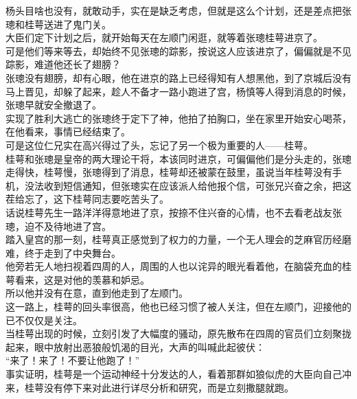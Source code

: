 \begin{multicols}{\theparacolNo}
杨头目啥也没有，就敢动手，实在是缺乏考虑，但就是这么个计划，还是差点把张璁和桂萼送进了鬼门关。\\

大臣们定下计划之后，就开始每天在左顺门闲逛，就等着张璁桂萼进京了。\\

可是他们等来等去，却始终不见张璁的踪影，按说这人应该进京了，偏偏就是不见踪影，难道他还长了翅膀？\\

张璁没有翅膀，却有心眼，他在进京的路上已经得知有人想黑他，到了京城后没有马上晋见，却躲了起来，趁人不备才一路小跑进了宫，杨慎等人得到消息的时候，张璁早就安全撤退了。\\

实现了胜利大逃亡的张璁终于定下了神，他拍了拍胸口，坐在家里开始安心喝茶，在他看来，事情已经结束了。\\

可是这位仁兄实在高兴得过了头，忘记了另一个极为重要的人——桂萼。\\

桂萼和张璁是皇帝的两大理论干将，本该同时进京，可偏偏他们是分头走的，张璁走得快，桂萼慢，张璁得到了消息，桂萼却还被蒙在鼓里，虽说当年桂萼没有手机，没法收到短信通知，但张璁实在应该派人给他报个信，可张兄兴奋之余，把这茬给忘了，这下桂萼同志要吃苦头了。\\

话说桂萼先生一路洋洋得意地进了京，按捺不住兴奋的心情，也不去看老战友张璁，迫不及待地进了宫。\\

踏入皇宫的那一刻，桂萼真正感觉到了权力的力量，一个无人理会的芝麻官历经磨难，终于走到了中央舞台。\\

他旁若无人地扫视着四周的人，周围的人也以诧异的眼光看着他，在脑袋充血的桂萼看来，这是对他的羡慕和妒忌。\\

所以他并没有在意，直到他走到了左顺门。\\

这一路上，桂萼的回头率很高，他也已经习惯了被人关注，但在左顺门，迎接他的已不仅仅是关注。\\

当桂萼出现的时候，立刻引发了大幅度的骚动，原先散布在四周的官员们立刻聚拢起来，眼中放射出恶狼般饥渴的目光，大声的叫喊此起彼伏：\\

“来了！来了！不要让他跑了！”\\

事实证明，桂萼是一个运动神经十分发达的人，看着那群如狼似虎的大臣向自己冲来，桂萼没有停下来对此进行详尽分析和研究，而是立刻撒腿就跑。\\


\end{multicols}
